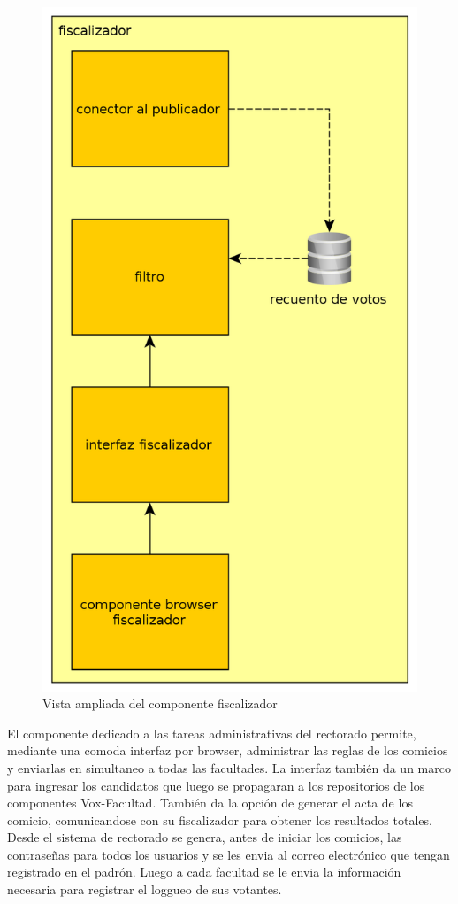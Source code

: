 \begin{figure}[H]
	\begin{center}
		\includegraphics[scale=0.26]{../diagramas/fiscalizador.png}
		\caption{Vista ampliada del componente fiscalizador}
	\end{center} 
\end{figure} 

El componente dedicado a las tareas administrativas del rectorado permite, mediante una comoda interfaz por browser, administrar las reglas de los comicios y enviarlas en simultaneo a todas las facultades. La interfaz también da un marco para ingresar los candidatos que luego se propagaran a los repositorios de los componentes Vox-Facultad. También da la opción de generar el acta de los comicio, comunicandose con su fiscalizador para obtener los resultados totales.
\\
Desde el sistema de rectorado se genera, antes de iniciar los comicios, las contraseñas para todos los usuarios y se les envia al correo electrónico que tengan registrado en el padrón. Luego a cada facultad se le envia la información necesaria para registrar el loggueo de sus votantes.

